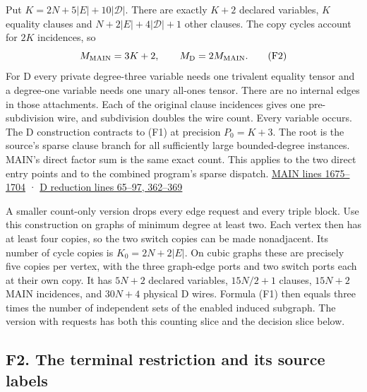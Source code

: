 \documentclass[11pt,a4paper]{article}
\begin{document}
Put \(K=2N+5|E|+10|\mathcal D|\). There are exactly \(K+2\) declared
variables, \(K\) equality clauses and \(N+2|E|+4|\mathcal D|+1\) other
clauses. The copy cycles account for \(2K\) incidences, so \[
 M_{\rm MAIN}=3K+2,\qquad M_{\rm D}=2M_{\rm MAIN}.
 \tag{F2}
\] For D every private degree-three variable needs one trivalent
equality tensor and a degree-one variable needs one unary all-ones
tensor. There are no internal edges in those attachments. Each of the
original clause incidences gives one pre-subdivision wire, and
subdivision doubles the wire count. Every variable occurs. The D
construction contracts to (F1) at precision \(P_0=K+3\). The root is the
source's sparse clause branch for all sufficiently large bounded-degree
instances. MAIN's direct factor sum is the same exact count. This
applies to the two direct entry points and to the combined program's
sparse dispatch.
\href{https://github.com/openai/math/blob/main/preprints/The-Exponential-Time-Hypothesis-is-False-October-25-2026/build/main_full_version.tex\#L1675}{MAIN
lines 1675--1704} ·
\href{https://github.com/openai/math/blob/main/preprints/The-Exponential-Time-Hypothesis-is-False-October-25-2026/build/quantitative-reduction.tex\#L65}{D
reduction lines 65--97, 362--369}

A smaller count-only version drops every edge request and every triple
block. Use this construction on graphs of minimum degree at least two.
Each vertex then has at least four copies, so the two switch copies can
be made nonadjacent. Its number of cycle copies is \(K_0=2N+2|E|\). On
cubic graphs these are precisely five copies per vertex, with the three
graph-edge ports and two switch ports each at their own copy. It has
\(5N+2\) declared variables, \(15N/2+1\) clauses, \(15N+2\) MAIN
incidences, and \(30N+4\) physical D wires. Formula (F1) then equals
three times the number of independent sets of the enabled induced
subgraph. The version with requests has both this counting slice and the
decision slice below.

\subsection{F2. The terminal restriction and its source
labels}\label{v8-f2.-the-terminal-restriction-and-its-source-labels}
\end{document}
